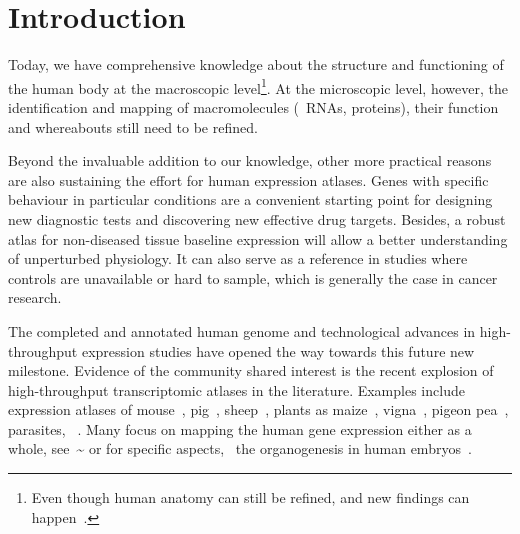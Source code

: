 \chapter*{Introduction}\label{ch:intro}

\setlength{\epigraphwidth}{0.62\textwidth}
\setlength{\epigraphrule}{0pt}

\vspace{-4mm}

Today, we have comprehensive knowledge %
about the structure and functioning of the human body
at the macroscopic level\footnote{%
Even though human anatomy can still be refined,
and new findings can happen~.}.
At the microscopic level, however,
the identification and mapping of macromolecules
(\eg\ \glspl{RNA},  proteins),
their function and whereabouts still need to be refined.\mybr\

Beyond the invaluable addition to our knowledge,
other more practical reasons are also sustaining the effort
for human expression atlases.
Genes with specific behaviour in particular conditions
are a convenient starting point
for designing new diagnostic tests
and discovering new effective drug targets.
Besides, a robust atlas for non-diseased tissue baseline expression
will allow a better understanding of unperturbed physiology.
It can also serve as a reference in studies where controls are unavailable
or hard to sample,
which is generally the case in cancer research.\mybr\

The completed and annotated human genome and
technological advances in high-throughput expression studies
have opened the way towards this future new milestone.
Evidence of the community shared interest is
the recent explosion of high-throughput transcriptomic atlases in the literature.
Examples include expression atlases of
mouse~, pig~,
sheep~, plants as maize~,
vigna~, pigeon pea~,
parasites, \eg\ .
Many focus on mapping the human gene expression either as a whole,
see~\eg\~
or for specific aspects,
\eg\ the organogenesis in human embryos~.\mybr\

